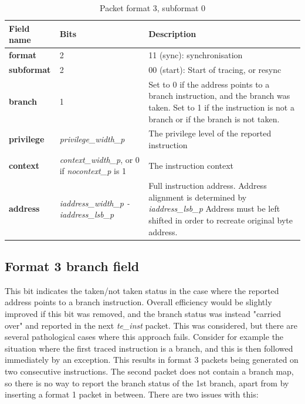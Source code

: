 \begin{table}[htp]
  \centering
  \caption{Packet format 3, subformat 0}
  \label{tab:te_inst3}
  \begin{tabulary}{\textwidth}{|l|p{35mm}|p{90mm}|}
    \hline
    {\bf Field name} & {\bf Bits} & {\bf Description} \\
    \hline
    \textbf{format} & 2 & 11 (sync): synchronisation\\
    \hline
    \textbf{subformat} & 2 & 00 (start): Start of tracing, or resync \\
    \hline
    \textbf{branch} & 1 & Set to 0 if the address points to a branch instruction, and the branch was taken.  
              Set to 1 if the instruction is not a branch or if the branch is not taken. \\
    \hline
    \textbf{privilege} & \textit {privilege\_width\_p} & 
                The privilege level of the reported instruction\\
    \hline
    \textbf{context} &  \textit {context\_width\_p}, 
               or 0 if \textit {nocontext\_p} is 1 & 
               The instruction context \\
    \hline
    \textbf{address} & \textit {iaddress\_width\_p - iaddress\_lsb\_p} & 
              Full instruction address.  Address alignment is determined by \textit {iaddress\_lsb\_p} Address must be left shifted in order to recreate original byte address. \\
    \hline
  \end{tabulary}
\end{table}

\subsection{Format 3 \textbf{branch} field}

This bit indicates the taken/not taken status in the case where the reported address points to a branch instruction.
Overall efficiency would be slightly improved if this bit was removed, and the branch status was instead 
"carried over" and reported in the next \textit{te\_inst} packet.  This was considered, but there are several
pathological cases where this approach fails.  Consider for example the situation where the first traced instruction
is a branch, and this is then followed immediately by an exception.  This results in format 3 packets being generated 
on two consecutive instructions.  The second packet does not contain a branch
map, so there is no way to report the branch status of the 1st branch, apart from by inserting a format 1 packet in 
between.  There are two issues with this:

